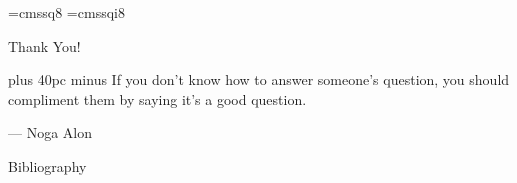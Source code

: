 \documentclass[aspectratio=169]{beamer}
\begin{document}
\font\eightss=cmssq8
\font\eightssi=cmssqi8
\newcommand\quoteAuthorDate[2]{\begingroup
  \baselineskip 10pt
  \parfillskip 0pt
  \interlinepenalty 10000 %
  \leftskip 0pt plus 40pc minus \parindent
  \let\rm=\eightss
  \let\sl=\eightssi
  \everypar{\sl}#1\par
  \nobreak\smallskip
  \noindent\rm--- #2\unskip\enspace\par
  \endgroup}
\begin{frame}
    \begin{center}
        {\color{sigma@mainblue} \LARGE Thank You!}
    \end{center}
    
    \begin{center}
        \item \quoteAuthorDate{If you don't know how to answer someone's question, you should compliment them by saying it's a good question.}{Noga Alon}
    \end{center}

\end{frame}

\begin{frame}[allowframebreaks]{Bibliography}
    
    
\end{frame}

\end{document}
